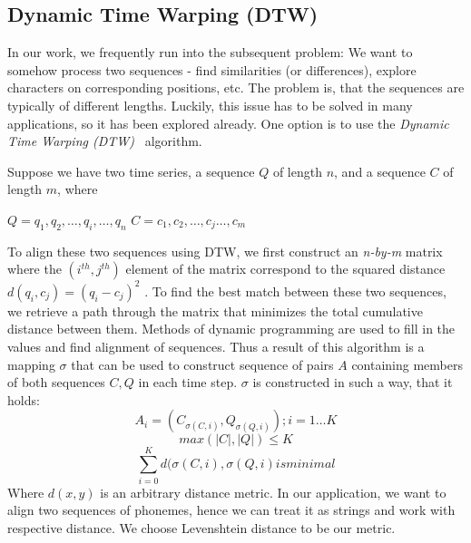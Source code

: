 \subsection{Dynamic Time Warping (DTW)}
In our work, we frequently run into the subsequent problem:
We want to somehow process two sequences - find similarities (or differences), explore characters on corresponding positions, etc.
The problem is, that the sequences are typically of different lengths.
Luckily, this issue has to be solved in many applications, so it has been explored already.
One option is to use the \textit{Dynamic Time Warping (DTW)}~\cite{ratanamahatana2004everything} algorithm.
\par
Suppose we have two time series, a sequence $Q$ of length $n$,
and a sequence $C$ of length $m$, where
\begin{center}
$Q = q_1 ,q_2 ,\dots, q_i ,\dots ,q_n$
\linebreak
$C = c_1 ,c_2 ,\dots, c_j \dots, c_m$
\end{center}
To align these two sequences using DTW, we first construct an \textit{n-by-m} matrix where the $(i^{th} , j^{th} )$ element of the matrix correspond to the squared distance $d(q_i, c_j) =
(q_i - c_j)^2$ .
To find the best match between these two sequences, we retrieve a path through the matrix that minimizes the total cumulative distance between them.
Methods of dynamic programming are used to fill in the values and find alignment of sequences.
Thus a result of this algorithm is a mapping $\sigma$ that can be used to construct sequence of pairs $A$ containing members of both sequences $C,Q$ in each time step.
$\sigma$ is constructed in such a way, that it holds:
\begin{equation}
A_i = (C_{\sigma (C,i)}, Q_{\sigma (Q, i)}); i = 1 \dots K
\end{equation} 
\begin{equation}
max(|C|,|Q|) \le K
\end{equation}
\begin{equation}
\sum_{i=0}^K d(\sigma (C,i), \sigma(Q,i) is minimal
\end{equation}
Where $d(x,y)$ is an arbitrary distance metric.
In our application, we want to align two sequences of phonemes, hence we can treat it as strings and work with respective distance.
We choose Levenshtein distance to be our metric.

